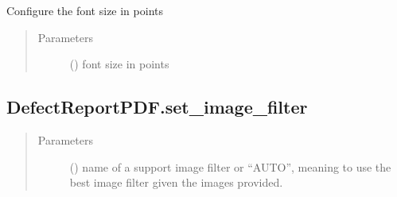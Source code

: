 \documentclass[letterpaper,10pt,english]{sphinxmanual}
\begin{document}
\begin{fulllineitems}
\begin{fulllineitems}
\label{\detokenize{generated/quality_assessment.quality_pdf_report.DefectReportPDF.set_font_size:quality_assessment.quality_pdf_report.DefectReportPDF.set_font_size}}
\sphinxAtStartPar
Configure the font size in points
\begin{quote}\begin{description}
\item[{Parameters}] \leavevmode
\sphinxAtStartPar
{} () \textendash{} font size in points

\end{description}\end{quote}

\end{fulllineitems}



\subsection{DefectReportPDF.set\_image\_filter}
\label{\detokenize{generated/quality_assessment.quality_pdf_report.DefectReportPDF.set_image_filter:defectreportpdf-set-image-filter}}\label{\detokenize{generated/quality_assessment.quality_pdf_report.DefectReportPDF.set_image_filter::doc}}

\begin{fulllineitems}
\label{\detokenize{generated/quality_assessment.quality_pdf_report.DefectReportPDF.set_image_filter:quality_assessment.quality_pdf_report.DefectReportPDF.set_image_filter}}\begin{quote}\begin{description}
\item[{Parameters}] \leavevmode
\sphinxAtStartPar
{} () \textendash{} name of a support image filter or “AUTO”,
meaning to use the best image filter given the images provided.


\end{description}
\end{quote}
\end{fulllineitems}
\end{fulllineitems}
\end{document}
